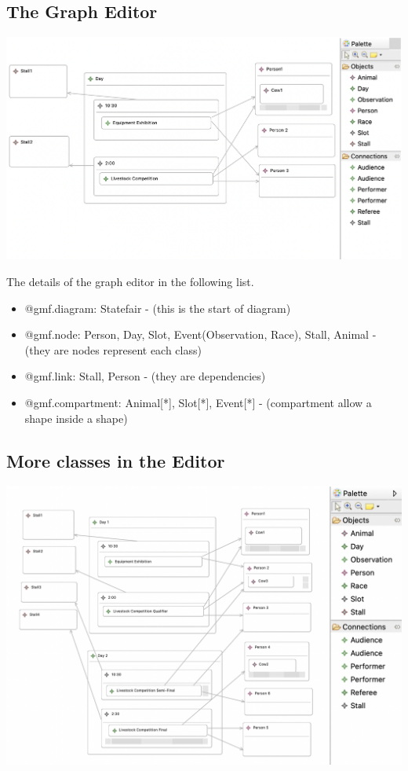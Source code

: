 \documentclass[12pt]{article}
\begin{document}
\subsection{The Graph Editor}
\includegraphics[scale = 0.6]{img/eugenia-editor}

The details of the graph editor in the following list.

\begin{itemize}
    \item @gmf.diagram: Statefair - (this is the start of diagram)
    \item @gmf.node: Person, Day, Slot, Event(Observation, Race), Stall, Animal - (they are nodes represent each class)
    \item @gmf.link: Stall, Person - (they are dependencies)
    \item @gmf.compartment: Animal[*], Slot[*], Event[*] - (compartment allow a shape inside a shape)
\end{itemize}

\subsection{More classes in the Editor}
\includegraphics[scale = 0.6]{img/eugenia-editor-more}
\end{document}
